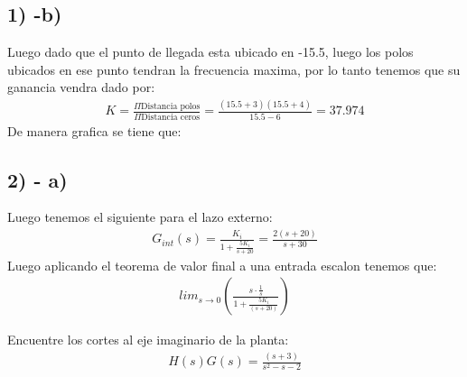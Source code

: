 \documentclass[
  11pt,
  letterpaper,
   addpoints,
   answers
  ]{exam}
\begin{document}
\begin{questions}
\begin{solution}
\subsection*{1) -b)}
Luego dado que el punto de llegada esta ubicado en -15.5, luego los polos ubicados en ese punto tendran la frecuencia maxima, por lo tanto tenemos que su ganancia vendra dado por:
\begin{align}
    K= \frac{\Pi \text{Distancia polos}}{\Pi \text{Distancia ceros}} = \frac{(15.5+3)(15.5+4)}{15.5-6} = 37.974
\end{align}
De manera grafica se tiene que:
\subsection*{2) - a)}
Luego tenemos el siguiente para el lazo externo:
\begin{align}
    G_{int}(s) = \frac{K_{i}}{1+\frac{5K_i}{s+20}}= \frac{2(s+20)}{s+30}
\end{align}
Luego aplicando el teorema de valor final a una entrada escalon tenemos que:
\begin{align}
    lim_{s \rightarrow 0}\left(\frac{s \cdot \frac{1}{s}}{1+ \frac{5K_i}{(s+20)}}\right)
\end{align}
\end{solution}
\question Encuentre los cortes al eje imaginario de la planta:
\begin{align}
    H(s)G(s) = \frac{(s+3)}{s^{2}-s-2}
\end{align}
\begin{solution}

\end{solution}
\end{questions}
\end{document}
